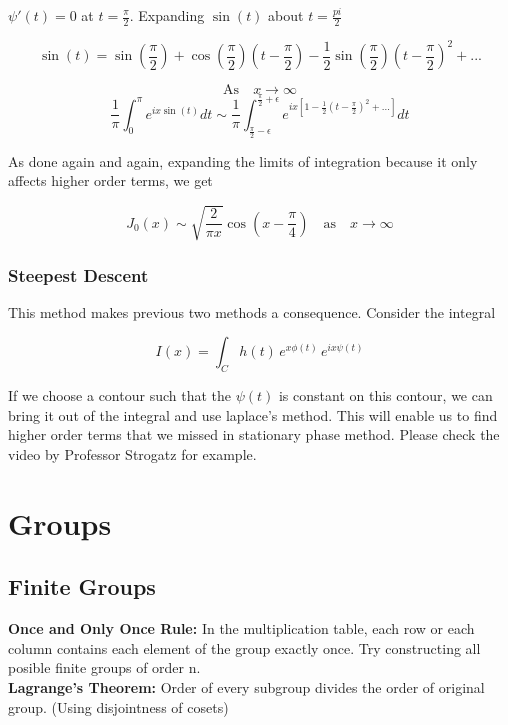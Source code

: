 \documentclass{report}
\begin{document}
\noindent $\psi'(t) = 0$ at $t=\frac{\pi}{2}$. Expanding $\sin(t)$ about $t=\frac{pi}{2}$

$$\sin\left(t\right) = \sin\left(\frac{\pi}{2}\right) + \cos\left(\frac{\pi}{2}\right)\left(t-\frac{\pi}{2}\right) -\frac{1}{2}\sin\left(\frac{\pi}{2}\right)\left(t-\frac{\pi}{2}\right)^2 + ...$$

$$\mathrm{As}\quad x\to\infty$$ 
$$\frac{1}{\pi}\int_{0}^{\pi}e^{ix\sin(t)}dt\sim \frac{1}{\pi}\int_{\frac{\pi}{2}-\epsilon}^{\frac{\pi}{2}+\epsilon}e^{ix\left[1-\frac{1}{2}\left(t-\frac{\pi}{2}\right)^2 +...\right]}dt$$

\noindent As done again and again, expanding the limits of integration because it only affects higher order terms, we get 

$$J_0\left(x\right) \sim \sqrt{\frac{2}{\pi x}} \cos\left(x-\frac{\pi}{4}\right) \quad\mathrm{as}\quad x\to\infty$$

\subsection{Steepest Descent}
This method makes previous two methods a consequence. Consider the integral 

$$I(x) = \int_{C}h(t)\, e^{x\phi(t)}\, e^{ix\psi(t)}$$

\noindent If we choose a contour such that the $\psi(t)$ is constant on this contour, we can bring it out of the integral and use laplace's method. This will enable us to find higher order terms that we missed in stationary phase method. Please check the video by Professor Strogatz for example.\\

\chapter{Groups}

\section{Finite Groups}

\noindent\textbf{Once and Only Once Rule:} In the multiplication table, each row or each column contains each element of the group exactly once. Try constructing all posible finite groups of order n.\\

\noindent\textbf{Lagrange's Theorem:} Order of every subgroup divides the order of original group. (Using disjointness of cosets)\\
\end{document}
